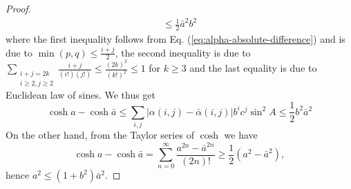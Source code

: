 \begin{proof}
\begin{align*}
	\le \frac{1}{2}\bar{a}^2b^2
	\end{align*}
	where the first inequality follows from Eq. (\ref{eq:alpha-absolute-difference}) and is due to $\min(p,q)\le \frac{i+j}{2}$, the second inequality is due to $\sum_{\substack{i+j=2k\\i\ge 2,j\ge 2}}\frac{i+j}{(i!)(j!)} \le \frac{(2k)^2}{(k!)^2} \le 1$ for $k\ge 3$ and the last equality is due to Euclidean law of sines. We thus get
	\begin{equation}
	\cosh a - \cosh\bar{a} \le \sum_{i,j}|\alpha(i,j) - \bar{\alpha}(i,j)|b^ic^j\sin^2A 
	\le \frac{1}{2} b^2\bar{a}^2
	\end{equation}
	On the other hand, from the Taylor series of $\cosh$ we have
	\[ \cosh a - \cosh\bar{a} = \sum_{n=0}^{\infty}\frac{a^{2n}-\bar{a}^{2n}}{(2n)!}\ge\frac{1}{2}(a^2-\bar{a}^2), \]
	hence $a^2\le (1+b^2)\bar{a}^2$.
	

\end{proof}
